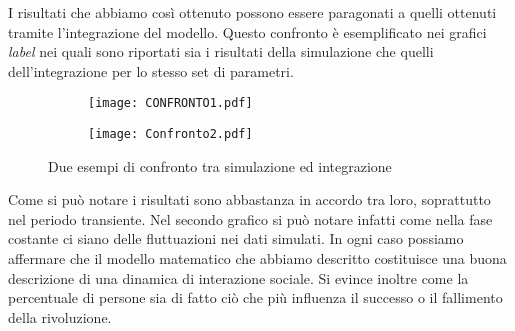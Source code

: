 I risultati che abbiamo così  ottenuto possono essere paragonati a quelli ottenuti tramite l'integrazione del modello. Questo confronto è esemplificato nei grafici \emph{label} nei quali sono riportati sia i risultati della simulazione che quelli dell'integrazione per lo stesso set di parametri.\\ 
\begin{figure}[H]
	\centering
	\begin{subfigure}[H]{0.49\textwidth}
		\centering
		\texttt{[image: CONFRONTO1.pdf]}
	\end{subfigure}
	\hfill
	\begin{subfigure}[H]{0.49\textwidth}
		\centering
		\texttt{[image: Confronto2.pdf]}
	\end{subfigure}
	\caption{Due esempi di confronto tra simulazione ed integrazione}
\end{figure}
Come si può notare i risultati sono abbastanza in accordo tra loro, soprattutto nel periodo transiente. Nel secondo grafico si può notare infatti come nella fase costante ci siano delle fluttuazioni nei dati simulati. In ogni caso possiamo affermare che il modello matematico che abbiamo descritto costituisce una buona descrizione di una dinamica di interazione sociale.
Si evince inoltre come la percentuale di persone sia di fatto ciò che più influenza il successo o il fallimento della rivoluzione.
